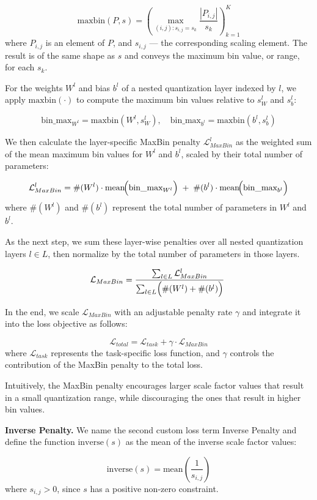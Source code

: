 \[
\text{maxbin}(P, s) = \left( \max_{(i,j) : s_{i,j} = s_k} \frac{|P_{i,j}|}{s_k} \right)_{k=1}^K
\]
where \( P_{i,j} \) is an element of \( P \), and \( s_{i,j} \) — the corresponding scaling element. 
The result is of the same shape as \(s \) and conveys the maximum bin value, or range, for each \( s_k\).

For the weights \(W^l\) and bias \( b^l\) of a nested quantization layer indexed by \( l \), 
we apply \( \text{maxbin}( \cdot)\) to compute the maximum bin values relative to
\(s_W^l \) and \( s_b^l\):

\[
\text{bin\_max}_{W^l} = \text{maxbin}(W^l, s_W^l), 
\quad 
\text{bin\_max}_{b^l}  = \text{maxbin}(b^l, s_b^l)
\]

We then calculate the layer-specific MaxBin penalty \( \mathcal{L}_{MaxBin}^l\)
as the weighted sum of the mean maximum bin values for \(W^l\) and \( b^l\), 
scaled by their total number of parameters:

\[
\mathcal{L}_{MaxBin}^l 
= 
\#(W^l) \cdot \mathrm{mean}\!\Bigl(\text{bin\_max}_{W^l}\Bigr) 
\;+\;
\#(b^l) \cdot \mathrm{mean}\!\Bigl(\text{bin\_max}_{b^l}\Bigr)
\]
where \( \#(W^l) \) and \( \#(b^l) \) represent the total number of parameters in \( W^l \) and \( b^l \).

As the next step, we sum these layer-wise penalties over all nested quantization layers \( l \in L \), 
then normalize by the total number of parameters in those layers. 

\[
\mathcal{L}_{MaxBin}
=
\frac{\sum_{l \in L}
\mathcal{L}_{MaxBin}^l}{\sum_{l \in L} \Bigl(\#(W^l) + \#(b^l)\Bigr)}
\
\]

In the end, we scale \( \mathcal{L}_{MaxBin} \) with an adjustable penalty rate \( \gamma \) 
and integrate it into the loss objective as follows:

\[
\mathcal{L}_{total} = \mathcal{L}_{task} + \gamma \cdot \mathcal{L}_{MaxBin}
\]
where \( \mathcal{L}_{task} \) represents the task-specific loss function,
and \( \gamma \) controls the contribution of the MaxBin penalty to the total loss.

Intuitively, the MaxBin penalty encourages larger scale factor values 
that result in a small quantization range, while
discouraging the ones that result in higher bin values.

\textbf{Inverse Penalty.} We name the second custom loss term Inverse Penalty and define 
the function \( \text{inverse}(s) \) 
as the mean of the inverse scale factor values:

\[
\text{inverse}(s) = \mathrm{mean}\!\left(\frac{1}{s_{i,j}}\right)
\]
where \( s_{i,j} > 0 \), since \( s \) has a positive non-zero constraint.

